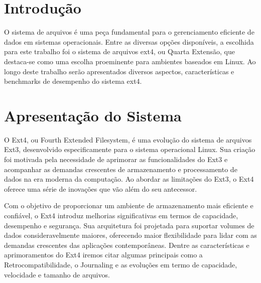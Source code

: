 \documentclass[
	12pt,				%
	openright,			%
	oneside,			%
	a4paper,			%
	chapter=TITLE,		%
	english,			%
	french,				%
	spanish,			%
	brazil				%
	]{abntex2}
\theoremstyle{definition}
\begin{document}
\frenchspacing 

\imprimircapa


\imprimirfolhaderosto

\newpage

\setlength{\absparsep}{18pt} %

\tableofcontents*
\cleardoublepage
\textual


\chapter{Introdução}
O sistema de arquivos é uma peça fundamental para o gerenciamento eficiente de dados em 
sistemas operacionais. Entre as diversas opções disponíveis, a escolhida para este trabalho 
foi o sistema de arquivos ext4, ou Quarta Extensão, que destaca-se como uma escolha proeminente para ambientes 
baseados em Linux. Ao longo deste trabalho serão apresentados diversos aspectos, características e benchmarks de desempenho 
do sistema ext4.

\chapter{Apresentação do Sistema}

O Ext4, ou Fourth Extended Filesystem, é uma evolução do sistema de arquivos Ext3, desenvolvido 
especificamente para o sistema operacional Linux. Sua criação foi motivada pela necessidade 
de aprimorar as funcionalidades do Ext3 e acompanhar as demandas crescentes de armazenamento e 
processamento de dados na era moderna da computação. Ao abordar as limitações do Ext3, o Ext4 
oferece uma série de inovações que vão além do seu antecessor.

Com o objetivo de proporcionar um ambiente de armazenamento mais eficiente e confiável, o 
Ext4 introduz melhorias significativas em termos de capacidade, desempenho e segurança. 
Sua arquitetura foi projetada para suportar volumes de dados consideravelmente maiores, 
oferecendo maior flexibilidade para lidar com as demandas crescentes das aplicações contemporâneas. 
Dentre as características e aprimoramentos do Ext4 iremos citar algumas principais como a Retrocompatibilidade,
o Journaling e as evoluções em termo de capacidade, velocidade e tamanho de arquivos.
\end{document}
